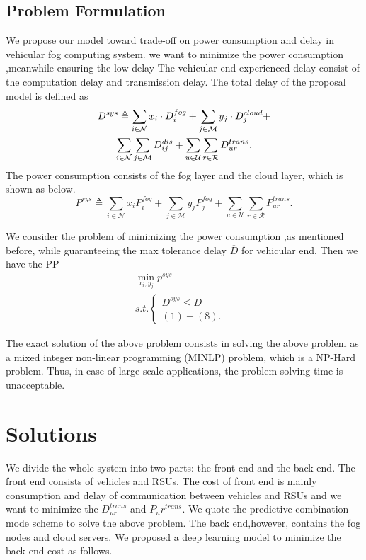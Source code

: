 \documentclass[twoside,twocolumn]{article}
\begin{document}
\subsection{Problem Formulation}
We propose our model toward trade-off on power consumption and delay in vehicular fog computing system. we want to minimize the power consumption ,meanwhile ensuring the low-delay	The vehicular end experienced delay consist of the computation delay and transmission delay.
The total delay of the proposal model is defined as
\begin{gather}
D^{sys} \triangleq \sum_{i \in \mathcal{N}} x_i \cdot D_i^{fog} + \sum_{j \in \mathcal{M}} y_j \cdot D_j^{cloud} + \notag \\
 \sum_{i \in \mathcal{N}}\sum_{j \in \mathcal{M}} D_{ij}^{dis}+ \sum_{u \in \mathcal{U}}\sum_{r \in \mathcal{R}} D_{ur}^{trans}.
\end{gather}
The power consumption consists of the fog layer and the cloud layer, which is shown as below.
$$
P^{sys} \triangleq \sum_{i \in \mathcal{N}}x_iP_i^{fog} + \sum_{j \in \mathcal{M}} y_jP_j^{fog}+\sum_{u \in \mathcal{U}}\sum_{r \in \mathcal{R}} P_{ur}^{trans}.
$$

We consider the problem of minimizing the power consumption ,as mentioned before, while guaranteeing the max tolerance delay $\overline{D}$ for vehicular end. Then we have the PP
\begin{equation}
\begin{split}
%
\min_{x_i,y_j} p^{sys}  \\  
s.t.\left\{
\begin{array}{lr}
D^{sys} \leq \overline{D} &  \\
(1)-(8). &
\end{array}
\right.
%	
\end{split}
\end{equation}


The exact solution of the above problem consists in solving the above problem as  a mixed integer non-linear
programming (MINLP) problem, which is a NP-Hard problem. Thus, in case of large scale applications, the problem solving time is unacceptable.
\section{Solutions}
We divide the whole system into two parts: the front end and the back end. The front end consists of vehicles and RSUs. The cost of front end is mainly consumption and delay of communication between vehicles and RSUs and we want to minimize the $D_{ur}^{trans}$ and $P_ur^{trans}$. We quote the predictive combination-mode scheme \cite{1} to solve the above problem. The back end,however, contains the fog nodes and cloud servers. We proposed a deep learning model to minimize the back-end cost as follows.
\end{document}
